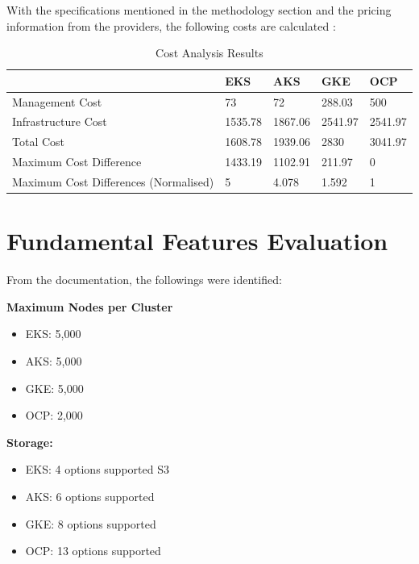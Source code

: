 With the specifications mentioned in the methodology section and the pricing information from the providers, the following costs are calculated \cite{CreateEstimateConfigure,PricingAzureKubernetes,GoogleCloudPricing,RedHatOpenShiftd}:
\begin{table}[!ht]
    \centering
    \begin{tabular}{|p{4cm}|p{2cm}|p{2cm}|p{2cm}|p{2cm}|} %
    \hline
         & EKS & AKS & GKE & OCP \\ \hline
        Management Cost & 73 & 72 & 288.03 & 500 \\ \hline
        Infrastructure Cost & 1535.78 & 1867.06 & 2541.97 & 2541.97 \\ \hline
        Total Cost & 1608.78 & 1939.06 & 2830 & 3041.97 \\ \hline
        Maximum Cost Difference & 1433.19 & 1102.91 & 211.97 & 0 \\ \hline
        Maximum Cost Differences (Normalised) & 5 & 4.078 & 1.592 & 1 \\ \hline
    \end{tabular}
    \caption{Cost Analysis Results} 
    \label{tab:cost-analysis}
\end{table}

\FloatBarrier
\section{Fundamental Features Evaluation}

From the documentation, the followings were identified:

\textbf{Maximum Nodes per Cluster}

\begin{itemize}
\tightlist
\item
  EKS: 5,000 \cite{KnownLimitsService}
\item
  AKS: 5,000  \cite{nickomangLimitsResourcesSKUs2024}
\item
  GKE: 5,000 \cite{QuotasLimitsGoogle}
\item
  OCP: 2,000  \cite{Chapter4Planning}
\end{itemize}



\textbf{Storage:}

\begin{itemize}
\tightlist
\item
  EKS: 4 options supported
  S3 \cite{StoreApplicationData}
\item
     AKS: 6 options supported \cite{tamramConceptsStorageAzure2024}
\item
  GKE: 8 options supported \cite{StorageGKEClusters} 
\item
  OCP: 13 options supported \cite{UnderstandingPersistentStorage} 
\end{itemize}

